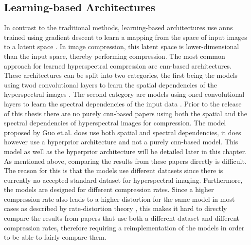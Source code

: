 \subsection{Learning-based Architectures}
In contrast to the traditional methods, learning-based architectures use \acp{ann} trained using gradient descent to learn a mapping from the space of input images to a latent space \citep{ruder_overview_2017}. In image compression, this latent space is lower-dimensional than the input space, thereby performing compression. 
The most common approach for learned hyperspectral compression are \ac{cnn}-based architectures. These architectures can be split into two categories, the first being the models using \ac{twod} convolutional layers to learn the spatial dependencies of the hyperspectral images \citep{la_grassa_hyperspectral_2022}. The second category are models using \ac{oned} convolutional layers to learn the spectral dependencies of the input data \citep{kuester_1d-convolutional_2021}\citep{kuester_transferability_2022}. Prior to the release of this thesis there are no purely \ac{cnn}-based papers using both the spatial and the spectral dependencies of hyperspectral images for compression. The model proposed by Guo et.al. \citep{guo_learned_2021} does use both spatial and spectral dependencies, it does however use a hyperprior architecture and not a purely \ac{cnn}-based model. This model as well as the hyperprior architecture will be detailed later in this chapter.
As mentioned above, comparing the results from these papers directly is difficult. The reason for this is that the models use different datasets since there is currently no accepted standard dataset for hyperspectral imaging. Furthermore, the models are designed for different compression rates. Since a higher compression rate also leads to a higher distortion for the same model in most cases as described by rate-distortion theory \citep{berger_rate-distortion_2003}, this makes it hard to directly compare the results from papers that use both a different dataset and different compression rates, therefore requiring a reimplementation of the models in order to be able to fairly compare them.

